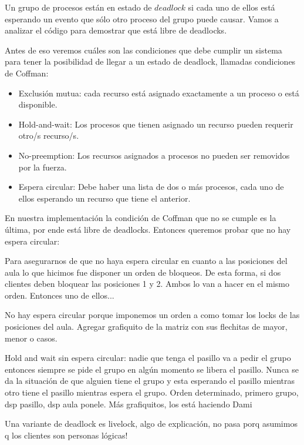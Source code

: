 Un grupo de procesos están en estado de $deadlock$ si cada uno de ellos está esperando un evento que sólo otro proceso del grupo puede causar.
Vamos a analizar el código para demostrar que está libre de deadlocks.

Antes de eso veremos cuáles son las condiciones que debe cumplir un sistema para tener la posibilidad de llegar a un estado de deadlock, llamadas
condiciones de Coffman:
\begin{itemize}
 \item Exclusión mutua: cada recurso está asignado exactamente a un proceso o está disponible.
 \item Hold-and-wait: Los procesos que tienen asignado un recurso pueden requerir otro/s recurso/s.
 \item No-preemption: Los recursos asignados a procesos no pueden ser removidos por la fuerza.
 \item Espera circular: Debe haber una lista de dos o más procesos, cada uno de ellos esperando un recurso que tiene el anterior.
\end{itemize}

En nuestra implementación la condición de Coffman que no se cumple es la última, por ende está libre de deadlocks.
Entonces queremos probar que no hay espera circular:

Para asegurarnos de que no haya espera circular en cuanto a las posiciones del aula lo que hicimos fue disponer un orden de bloqueos.
De esta forma, si dos clientes deben bloquear las posiciones 1 y 2. Ambos lo van a hacer en el mismo orden. Entonces uno de ellos... %



No hay espera circular porque imponemos un orden a como tomar los locks de las posiciones del aula. 
Agregar grafiquito de la matriz con sus flechitas de mayor, menor o casos.

Hold and wait sin espera circular: nadie que tenga el pasillo va a pedir el grupo entonces siempre se pide el grupo en algún momento se libera el pasillo.
Nunca se da la situación de que alguien tiene el grupo y esta esperando el pasillo mientras otro tiene el pasillo mientras espera el grupo.
Orden determinado, primero grupo, dsp pasillo, dsp aula ponele.
Más grafiquitos, los está haciendo Dami

Una variante de deadlock es livelock, algo de explicación, no pasa porq asumimos q los clientes son personas lógicas!